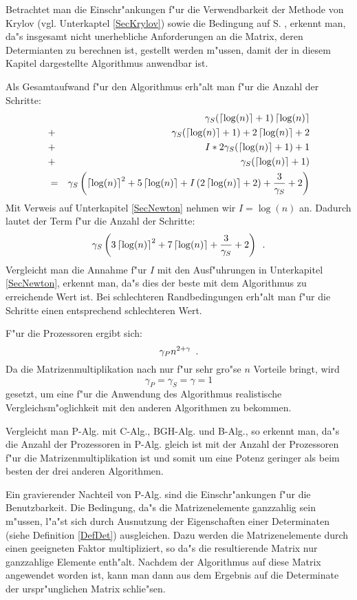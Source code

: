 Betrachtet man die Einschr"ankungen f"ur die Verwendbarkeit der Methode
von Krylov (vgl. Unterkaptel \ref{SecKrylov}) sowie die Bedingung
 auf S. \pageref{EquWellConditioned}, erkennt
man, da"s insgesamt nicht unerhebliche Anforderungen an die Matrix,
deren Determianten zu berechnen ist, gestellt werden m"ussen, damit der
in diesem Kapitel dargestellte Algorithmus anwendbar ist.

Als Gesamtaufwand f"ur den Algorithmus erh"alt man f"ur die
Anzahl der Schritte:
\begin{eqnarray*}
   & & \gamma_S (\left\lceil\log(n)\right\rceil + 1) \left\lceil\log(n)\right\rceil \\
   & + & \gamma_S (\left\lceil\log(n)\right\rceil +1 ) + 2\left\lceil\log(n)\right\rceil + 2 \\
   & + & I * 2 \gamma_S (\left\lceil\log(n)\right\rceil + 1) + 1 \\
   & + & \gamma_S(\left\lceil\log(n)\right\rceil+1) \\
   & = &
      \gamma_S \left( \left\lceil\log(n)\right\rceil^2 + 5 \left\lceil\log(n)\right\rceil
    + I \left( 2 \left\lceil\log(n)\right\rceil + 2 \right) + \frac{3}{\gamma_S} + 2 \right)
\end{eqnarray*}
Mit Verweis auf Unterkapitel \ref{SecNewton} nehmen wir $I= \log(n)$ an.
Dadurch lautet der Term f"ur die Anzahl der Schritte:
\[
    \gamma_S \left( 3 \left\lceil\log(n)\right\rceil^2 + 7 \left\lceil\log(n)\right\rceil
    + \frac{3}{\gamma_S} + 2 \right) \mbox{\hspace{0.5em}.}
\]
Vergleicht man die Annahme f"ur $I$ mit den Ausf"uhrungen in Unterkapitel
\ref{SecNewton}, erkennt man, da"s dies der beste mit dem Algorithmus zu
erreichende Wert ist. Bei schlechteren Randbedingungen erh"alt man f"ur
die Schritte einen entsprechend schlechteren Wert.

F"ur die Prozessoren ergibt sich:
\[ 
    \gamma_P n^{2+\gamma} \mbox{\hspace{0.5em}.}
\]
Da die Matrizenmultiplikation nach \cite{CW90} nur f"ur sehr gro"se $n$
Vorteile bringt, wird \[ \gamma_P = \gamma_S = \gamma = 1 \] gesetzt,
um eine f"ur die Anwendung des Algorithmus realistische 
Vergleichsm"oglichkeit mit den anderen Algorithmen zu bekommen.

Vergleicht man P-Alg. mit C-Alg., BGH-Alg. und B-Alg., so erkennt man, da"s
die Anzahl der Prozessoren in P-Alg. gleich ist mit der Anzahl der
Prozessoren f"ur die Matrizenmultiplikation ist und somit um eine Potenz
geringer als beim besten der drei anderen Algorithmen.

Ein gravierender Nachteil von P-Alg. sind die Einschr"ankungen
f"ur die Benutzbarkeit. Die Bedingung, da"s die Matrizenelemente ganzzahlig
sein m"ussen, l"a"st sich durch Ausnutzung der Eigenschaften einer 
Determinaten (siehe Definition \ref{DefDet}) ausgleichen. Dazu werden
die Matrizenelemente durch einen geeigneten Faktor multipliziert, so da"s
die resultierende Matrix nur ganzzahlige Elemente enth"alt. Nachdem der
Algorithmus auf diese Matrix angewendet worden ist, kann man dann aus
dem Ergebnis auf die Determinate der urspr"unglichen Matrix schlie"sen.

